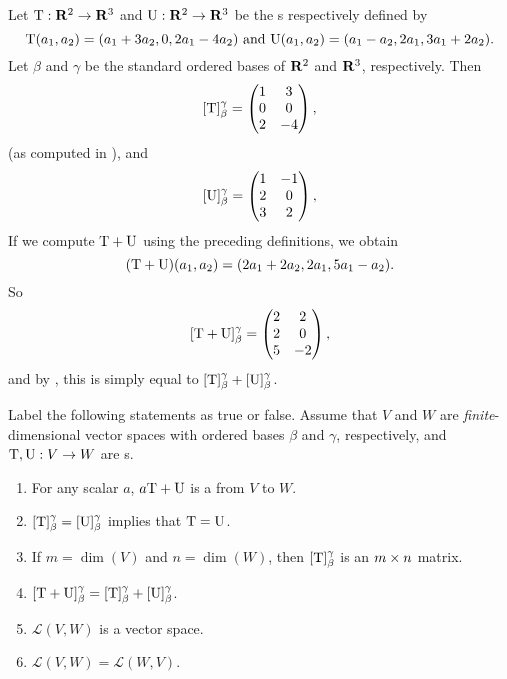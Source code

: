 \begin{example} \label{example 2.2.5}
Let \(\mathrm{T} : \mathbf{R}^2 \to \mathbf{R}^3\) and \(\mathrm{U} : \mathbf{R}^2 \to \mathbf{R}^3\) be the \LTRAN{}s respectively defined by
\[
    \mathrm{T}(a_1, a_2) = (a_1 + 3a_2, 0, 2a_1 - 4a_2) \text{ and } \mathrm{U}(a_1, a_2) = (a_1 - a_2, 2a_1, 3a_1 + 2a_2).
\]
Let \(\beta\) and \(\gamma\) be the standard ordered bases of \(\mathbf{R}^2\) and \(\mathbf{R}^3\), respectively.
Then
\[
    [\mathrm{T}]_{\beta}^{\gamma} = \begin{pmatrix} 1 & 3 \\ 0 & 0 \\ 2 & -4 \end{pmatrix},
\]
(as computed in ), and
\[
    [\mathrm{U}]_{\beta}^{\gamma} = \begin{pmatrix} 1 & -1 \\ 2 & 0 \\ 3 & 2 \end{pmatrix},
\]
If we compute \(\mathrm{T} + \mathrm{U}\) using the preceding definitions, we obtain
\[
    (\mathrm{T} + \mathrm{U})(a_1, a_2) = (2a_1 + 2a_2, 2a_1, 5a_1 - a_2).
\]
So
\[
    [\mathrm{T} + \mathrm{U}]_{\beta}^{\gamma} = \begin{pmatrix} 2 & 2 \\ 2 & 0 \\ 5 & -2 \end{pmatrix},
\]
and by , this is simply equal to \([\mathrm{T}]_{\beta}^{\gamma} + [\mathrm{U}]_{\beta}^{\gamma}\).
\end{example}

\exercisesection

\begin{exercise} \label{exercise 2.2.1}
Label the following statements as true or false.
Assume that \(V\) and \(W\) are \emph{finite}-dimensional vector spaces with ordered bases \(\beta\) and \(\gamma\), respectively, and \(\mathrm{T}, \mathrm{U} : V \to W\) are \LTRAN{}s.
\begin{enumerate}
\item For any scalar \(a\), \(a\mathrm{T} + \mathrm{U}\) is a \LTRAN{} from \(V\) to \(W\).
\item \([\mathrm{T}]_{\beta}^{\gamma} = [\mathrm{U}]_{\beta}^{\gamma}\) implies that \(\mathrm{T} = \mathrm{U}\).
\item If \(m = \dim(V)\) and \(n = \dim(W)\), then \([\mathrm{T}]_{\beta}^{\gamma}\) is an \(m \times n\) matrix.
\item \([\mathrm{T} + \mathrm{U}]_{\beta}^{\gamma} = [\mathrm{T}]_{\beta}^{\gamma} + [\mathrm{U}]_{\beta}^{\gamma}\).
\item \(\mathcal{L}(V, W)\) is a vector space.
\item \(\mathcal{L}(V, W) = \mathcal{L}(W, V)\).
\end{enumerate}
\end{exercise}

